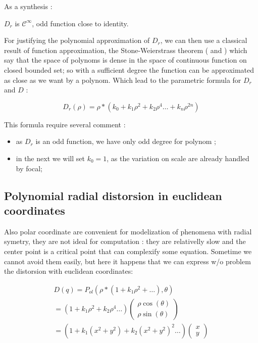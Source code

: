 As a synthesis :

\begin{proposal} \;
\label{DrHyp}
       $D_r$ is $\mathcal{C}^{\infty}$, odd function close to identity.
\end{proposal}

For justifying the polynomial approximation of $D_r$, we can then use a classical result of function 
approximation, the Stone-Weierstrass theorem (\cite{Weierstrass1885} and \cite{Stone1937})
which say that the space of polynoms is dense in the space of continuous function on closed bounded set;
so with a sufficient degree the function can be approximated as close as we want by a polynom.
Which lead to the parametric formula for $D_r$ and $D$ :

\begin{equation}
	D_r(\rho)  =   \rho  * (k_0 + k_1 \rho^ 2 + k_2 \rho^4 \dots  + k_n \rho^{2n})
\end{equation}

This formula require several comment :

\begin{itemize}
    \item  as $D_r$ is an odd function, we have only odd degree for polynom ; 

    \item  in the next we will set $k_0=1$, as the variation on scale are already handled by focal;
\end{itemize}


\subsection{Polynomial radial distorsion in euclidean coordinates}

Also polar coordinate are convenient for modelization of phenomena with radial symetry, 
they are not ideal for computation : they are relativelly slow and  the center point is
a critical point that can complexify some equation.  Sometime we cannot avoid them
easily, but here it happens that we can express w/o problem the distorsion
with euclidean coordinates:

\begin{equation}
\begin{multlined}
D(q)  =   P_{ol}(\rho  * (1 + k_1 \rho^ 2 + \dots) ,\theta)  \\
=   (1 + k_1 \rho^ 2 +  k_2 \rho^ 4 \dots)  \begin{pmatrix} \rho\cos(\theta) \\ \rho \sin(\theta) \end{pmatrix} \\
=   (1 + k_1 (x^2+y^2) +  k_2 (x^2+y^2) ^2 \dots)  \begin{pmatrix} x \\ y \end{pmatrix}
\end{multlined}
	\label{PolDistEucl}
\end{equation}



